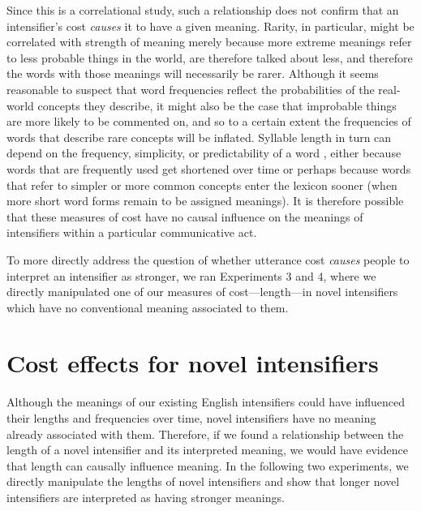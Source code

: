 \documentclass[10pt,letterpaper]{article}
\begin{document}
Since this is a correlational study, such a relationship does not confirm that an intensifier's cost \emph{causes} it to have a given meaning.
Rarity, in particular, might be correlated with strength of meaning merely because more extreme meanings refer to less probable things in the world, are therefore talked about less, and therefore the words with those meanings will necessarily be rarer.
Although it seems reasonable to suspect that word frequencies reflect the probabilities of the real-world concepts they describe, it might also be the case that improbable things are more likely to be commented on, and so to a certain extent the frequencies of words that describe rare concepts will be inflated. Syllable length in turn can depend on the frequency, simplicity, or predictability of a word \cite{zipf, lewis, piantadosi}, either because words that are frequently used get shortened over time \cite{lewis2015} or perhaps because words that refer to simpler or more common concepts enter the lexicon sooner (when more short word forms remain to be assigned meanings). It is therefore possible that these measures of cost have no causal influence on the meanings of intensifiers within a particular communicative act.

To more directly address the question of whether utterance cost \emph{causes} people to interpret an intensifier as stronger, we ran Experiments 3 and 4, where we directly manipulated one of our measures of cost---length---in novel intensifiers which have no conventional meaning associated to them.

\section{Cost effects for novel intensifiers}

Although the meanings of our existing English intensifiers could have influenced their lengths and frequencies over time, novel intensifiers have no meaning already associated with them. Therefore, if we found a relationship between the length of a novel intensifier and its interpreted meaning, we would have evidence that length can causally influence meaning. In the following two experiments, we directly manipulate the lengths of novel intensifiers and show that longer novel intensifiers are interpreted as having stronger meanings.
\end{document}
